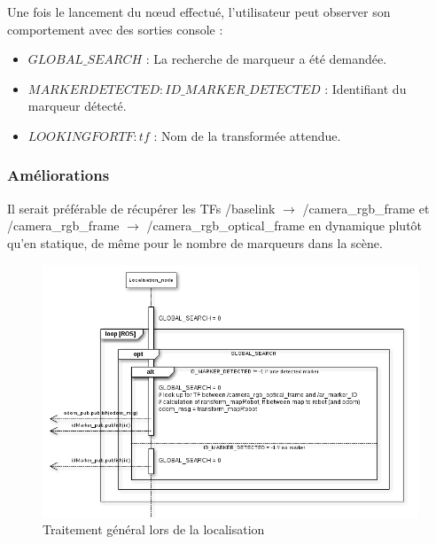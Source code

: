 \documentclass[10pt,a4paper]{article}
\begin{document}
Une fois le lancement du nœud effectué, l'utilisateur peut observer son comportement avec des sorties console :
\begin{itemize}
\item $GLOBAL\_SEARCH$ : La recherche de marqueur a été demandée.
\item $ MARKER DETECTED: ID\_MARKER\_DETECTED$ : Identifiant du marqueur détecté.
\item $LOOKING FOR TF: tf$ : Nom de la transformée attendue.
\end{itemize}

\subsubsection{Améliorations}
Il serait préférable de récupérer les TFs /baselink $\rightarrow$ /camera\_rgb\_frame et /camera\_rgb\_frame $\rightarrow$ /camera\_rgb\_optical\_frame en dynamique plutôt qu'en statique, de même pour le nombre de marqueurs dans la scène.

\begin{figure}
\center\noindent
\includegraphics[scale=0.6]{figures/locaprocess.png} 
\caption{Traitement général lors de la localisation}	
\end{figure}
\end{document}
